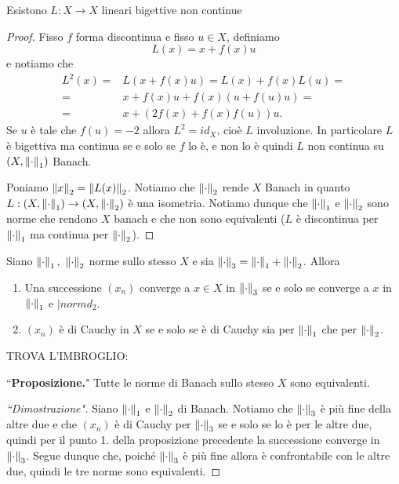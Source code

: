 \begin{remark}
Esistono $L:X\to X$ lineari bigettive non continue
\end{remark}
\begin{proof}
Fisso $f$ forma discontinua e fisso $u\in X$, definiamo
\[L(x)=x+f(x)u\]
e notiamo che
\begin{align*}
L^2(x)=&L(x+f(x)u)=L(x)+f(x)L(u)=\\
=&x+f(x)u +f(x)(u+f(u)u)=\\
=&x+(2f(x)+f(x)f(u))u.
\end{align*}
Se $u$ \`e tale che $f(u)=-2$ allora $L^2=id_X$, cio\`e $L$ involuzione. In particolare $L$ \`e bigettiva ma continua se e solo se $f$ lo \`e, e non lo \`e quindi $L$ non continua su $(X,\left\Vert{\cdot}\right\Vert_1)$ Banach.

Poniamo $\left\Vert{x}\right\Vert_2=\left\Vert{L(x)}\right\Vert_2$. Notiamo che $\left\Vert{\cdot}\right\Vert_2$ rende $X$ Banach in quanto $L:(X,\left\Vert{\cdot}\right\Vert_1)\to (X,\left\Vert{\cdot}\right\Vert_2)$ \`e una isometria. Notiamo dunque che $\left\Vert{\cdot}\right\Vert_1$ e $\left\Vert{\cdot}\right\Vert_2$ sono norme che rendono $X$ banach e che non sono equivalenti ($L$ \`e discontinua per $\left\Vert{\cdot}\right\Vert_1$ ma continua per $\left\Vert{\cdot}\right\Vert_2$).
\end{proof}

\begin{exercise}
Siano $\left\Vert{\cdot}\right\Vert_1,\ \left\Vert{\cdot}\right\Vert_2$ norme sullo stesso $X$ e sia $\left\Vert{\cdot}\right\Vert_3=\left\Vert{\cdot}\right\Vert_1+\left\Vert{\cdot}\right\Vert_2$. Allora
\begin{enumerate}
    \item Una successione $(x_n)$ converge a $x\in X$ in $\left\Vert{\cdot}\right\Vert_3$ se e solo se converge a $x$ in $\left\Vert{\cdot}\right\Vert_1$ e $|normd_2$.
    \item $(x_n)$ \`e di Cauchy in $X$ se e solo se \`e di Cauchy sia per $\left\Vert{\cdot}\right\Vert_1$ che per $\left\Vert{\cdot}\right\Vert_2$.
\end{enumerate}
\end{exercise}

\begin{exercise}
TROVA L'IMBROGLIO:

\noindent
``\textbf{Proposizione.}" Tutte le norme di Banach sullo stesso $X$ sono equivalenti.
\begin{proof}[``Dimostrazione"]
    Siano $\left\Vert{\cdot}\right\Vert_1$ e $\left\Vert{\cdot}\right\Vert_2$ di Banach. Notiamo che $\left\Vert{\cdot}\right\Vert_3$ \`e pi\`u fine della altre due e che $(x_n)$ \`e di Cauchy per $\left\Vert{\cdot}\right\Vert_3$ se e solo se lo \`e per le altre due, quindi per il punto 1. della proposizione precedente la successione converge in $\left\Vert{\cdot}\right\Vert_3$. Segue dunque che, poich\'e $\left\Vert{\cdot}\right\Vert_3$ \`e pi\`u fine allora \`e confrontabile con le altre due, quindi le tre norme sono equivalenti.
\end{proof}
\end{exercise}


